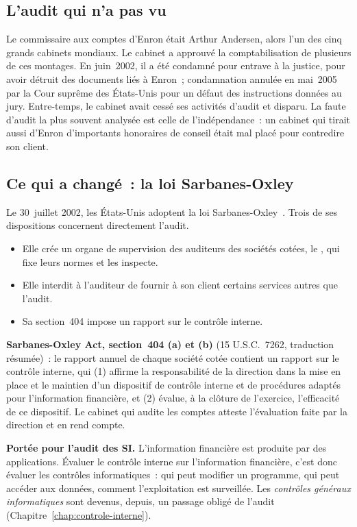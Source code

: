 \subsection{L'audit qui n'a pas vu}

Le commissaire aux comptes d'Enron était Arthur Andersen, alors l'un des
cinq grands cabinets mondiaux. Le cabinet a approuvé la comptabilisation de
plusieurs de ces montages. En juin~2002, il a été condamné pour entrave à
la justice, pour avoir détruit des documents liés à Enron~; condamnation
annulée en mai~2005 par la Cour suprême des États-Unis pour un défaut des
instructions données au jury. Entre-temps, le cabinet avait cessé ses
activités d'audit et disparu. La faute d'audit la plus souvent analysée est
celle de l'indépendance~: un cabinet qui tirait aussi d'Enron d'importants
honoraires de conseil était mal placé pour contredire son client.

\subsection{Ce qui a changé~: la loi Sarbanes-Oxley}

Le 30~juillet 2002, les États-Unis adoptent la loi
Sarbanes-Oxley~\cite{sox2002}. Trois de ses dispositions concernent
directement l'audit.
\begin{itemize}
    \item Elle crée un organe de supervision des auditeurs des sociétés
          cotées, le , qui fixe leurs normes et les inspecte.
    \item Elle interdit à l'auditeur de fournir à son client certains
          services autres que l'audit.
    \item Sa section~404 impose un rapport sur le contrôle interne.
\end{itemize}

\begin{boxjuris}
\textbf{Sarbanes-Oxley Act, section~404 (a) et (b)} (15 U.S.C.~7262,
traduction résumée)~: le rapport annuel de chaque société cotée contient un
rapport sur le contrôle interne, qui (1) affirme la responsabilité de la
direction dans la mise en place et le maintien d'un dispositif de contrôle
interne et de procédures adaptés pour l'information financière, et (2)
évalue, à la clôture de l'exercice, l'efficacité de ce dispositif. Le
cabinet qui audite les comptes atteste l'évaluation faite par la direction
et en rend compte.

\medskip
\textbf{Portée pour l'audit des SI.} L'information financière est produite
par des applications. Évaluer le contrôle interne sur l'information
financière, c'est donc évaluer les contrôles informatiques~: qui peut
modifier un programme, qui peut accéder aux données, comment
l'exploitation est surveillée. Les \emph{contrôles généraux
informatiques} sont devenus, depuis, un passage obligé de l'audit
(Chapitre~\ref{chap:controle-interne}).
\end{boxjuris}

